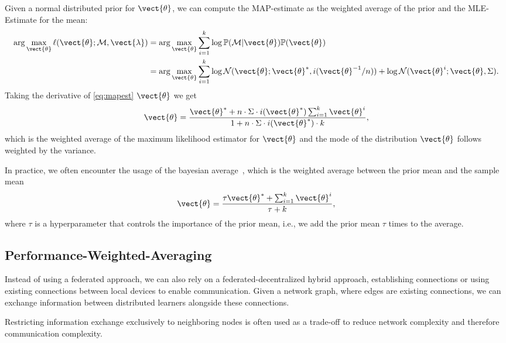 Given a normal distributed prior for $\vect{\theta}$, we can  compute the MAP-estimate as the weighted average of the prior and the MLE-Estimate for the mean:
\begin{equation}
    \label{eq:mapest}
    \begin{split}
    \arg\max_{\vect{\theta}} \ell(\vect{\theta}; \mathcal{M}, \vect{\lambda}) &= \arg\max_{\vect{\theta}} \sum_{i=1}^k \log \mathbb{P}(\mathcal{M}\lvert \vect{\theta}) \mathbb{P}(\vect{\theta}) \\
    &= \arg\max_{\vect{\theta}} \sum_{i=1}^k   \log \mathcal{N}(\vect{\theta}; \vect{\theta}^*, i(\vect{\theta}^{-1}/n))+  \log \mathcal{N}(\vect{\theta}^i ; \vect{\theta}, \Sigma).
    \end{split}
\end{equation}
Taking the derivative of \autoref{eq:mapest} \wrt $\vect{\theta}$ we get
\begin{equation}
    \vect{\theta} = \frac{\vect{\theta}^*  + n \cdot \Sigma \cdot i(\vect{\theta}^*) \sum_{i=1}^k \vect{\theta}^i}{1 + n \cdot \Sigma \cdot i(\vect{\theta}^*) \cdot k},
\end{equation}
which is the weighted average of the maximum likelihood estimator for $\vect{\theta}$ and the mode of the distribution $\vect{\theta}$ follows weighted by the variance.

In practice, we often encounter the usage of the bayesian average~\cite{de2011bayesian}, which is the weighted average between the prior mean and the sample mean
\begin{equation}
    \vect{\theta} = \frac{\tau \vect{\theta}^* + \sum_{i=1}^k \vect{\theta}^i}{\tau + k},
\end{equation}
where $\tau$ is a hyperparameter that controls the importance of the prior mean, i.e., we add the prior mean $\tau$ times to the average. 

\subsection{Performance-Weighted-Averaging}

Instead of using a federated approach, we can also rely on a federated-decentralized hybrid approach, establishing connections or using existing connections between local devices to enable communication.
Given a network graph, where edges are existing connections, we can exchange information between distributed learners alongside these connections.

Restricting information exchange exclusively to neighboring nodes is often used as a trade-off to reduce network complexity and therefore communication complexity.

